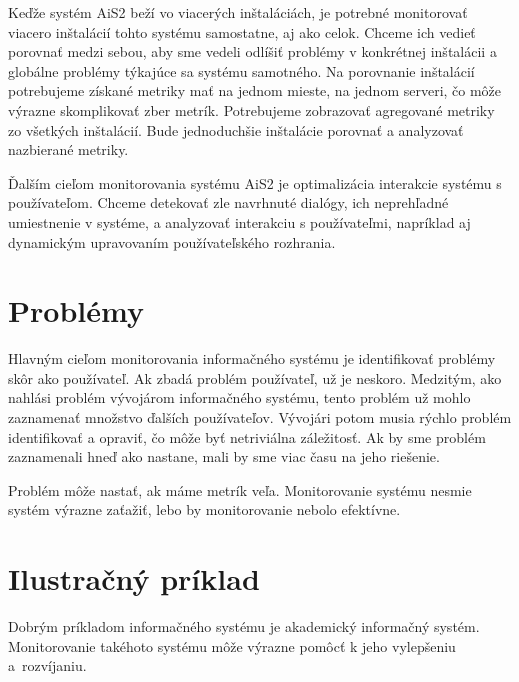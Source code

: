 \documentclass[a4paper, upjsfrontpage, thesismargins, thesislinespacing]{rnthesis}
\begin{document}
Keďže systém AiS2 beží vo viacerých inštaláciách, 
	je potrebné monitorovať viacero inštalácií tohto systému samostatne, aj ako celok.
Chceme ich vedieť porovnať medzi sebou, 
	aby sme vedeli odlíšiť problémy v konkrétnej inštalácii a globálne problémy týkajúce sa systému samotného.
Na porovnanie inštalácií potrebujeme získané metriky mať na jednom mieste, na jednom serveri, čo môže výrazne skomplikovať zber metrík.
Potrebujeme zobrazovať agregované metriky zo všetkých inštalácií.
Bude jednoduchšie inštalácie porovnať a analyzovať nazbierané metriky.

Ďalším cieľom monitorovania systému AiS2 je optimalizácia interakcie systému s používateľom.
Chceme detekovať zle navrhnuté dialógy, ich neprehľadné umiestnenie v systéme, a analyzovať interakciu s používateľmi, napríklad aj dynamickým upravovaním používateľského rozhrania.

\section{Problémy}

Hlavným cieľom monitorovania informačného systému je identifikovať problémy skôr ako používateľ.
Ak zbadá problém používateľ, už je neskoro.
Medzitým, ako nahlási problém vývojárom informačného systému, tento problém už mohlo zaznamenať množstvo ďalších používateľov.
Vývojári potom musia rýchlo problém identifikovať a opraviť, čo môže byť netriviálna záležitosť.
Ak by sme problém zaznamenali hneď ako nastane, mali by sme viac času na jeho riešenie.

Problém môže nastať, ak máme metrík veľa.
Monitorovanie systému nesmie systém výrazne zaťažiť, lebo by monitorovanie nebolo efektívne.

\section{Ilustračný príklad}

Dobrým príkladom informačného systému je akademický informačný systém.
Monitorovanie takéhoto systému môže výrazne pomôcť k jeho vylepšeniu a~rozví\-janiu.
\end{document}
